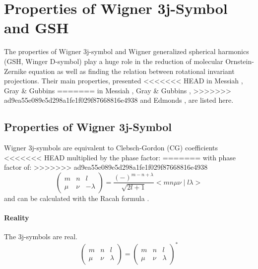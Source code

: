 
\chapter{Properties of Wigner 3j-Symbol and GSH \label{chpt:symmetry}}

The properties of Wigner 3j-symbol and Wigner generalized spherical
harmonics (GSH, Winger D-symbol) play a huge role in the reduction
of molecular Ornstein-Zernike equation as well as finding the relation
between rotational invariant projections. Their main properties, presented
<<<<<<< HEAD
in Messiah \citep{Messiah}, Gray \& Gubbins \citep{Gray-Gubbins}
=======
in Messiah \citep{Messiah}, Gray & Gubbins \citep{Gray-Gubbins},
>>>>>>> ad9ea55e089e5d298a1fe1f029f87668816e4938
and Edmonds \citep{Edmonds}, are listed here.


\section{Properties of Wigner 3j-Symbol}

Wigner 3j-symbols are equivalent to Clebsch-Gordon (CG) coefficients
<<<<<<< HEAD
multiplied by the phase factor:
=======
with phase factor of:
>>>>>>> ad9ea55e089e5d298a1fe1f029f87668816e4938
\begin{equation}
\left(\begin{array}{ccc}
m & n & l\\
\mu & \nu & -\lambda
\end{array}\right)=\frac{\left(-\right)^{m-n+\lambda}}{\sqrt{2l+1}}<mn\mu\nu\mid l\lambda>
\end{equation}
and can be calculated with the Racah formula \citep{Messiah}.


\subsubsection*{Reality}

The 3j-symbols are real.
\begin{equation}
\left(\begin{array}{ccc}
m & n & l\\
\mu & \nu & \lambda
\end{array}\right)=\left(\begin{array}{ccc}
m & n & l\\
\mu & \nu & \lambda
\end{array}\right)^{*}
\end{equation}



